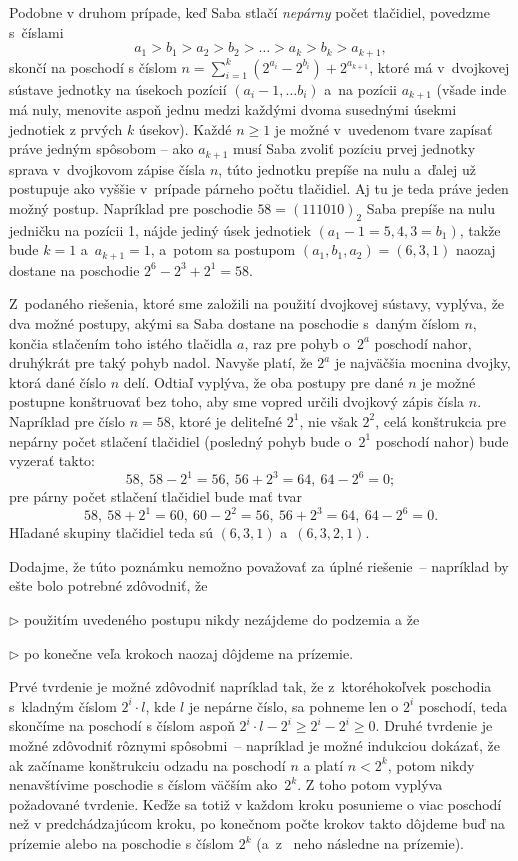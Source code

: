 {Podobne v druhom prípade, keď Saba stlačí {\it nepárny} počet tlačidiel, povedzme s~číslami
$$a_1>b_1>a_2>b_2>\dots>a_k>b_k>a_{k+1},
$$
skončí na poschodí s číslom $n=\sum_{i=1}^k (2^{a_i} - 2^{b_i}) + 2^{a_{k+1}}$, ktoré má v~dvojkovej sústave jednotky na úsekoch pozícií $(a_i-1,\dots b_i)$ a~na pozícii $a_{k+1}$ (všade inde má nuly, menovite aspoň jednu medzi každými dvoma susednými úsekmi jednotiek z prvých $k$ úsekov). Každé $n\geq1$ je možné v~uvedenom tvare zapísať práve jedným spôsobom -- ako $a_{k+1}$ musí Saba zvoliť pozíciu prvej jednotky sprava v~dvojkovom zápise čísla $n$, túto jednotku prepíše na nulu a~ďalej už postupuje ako vyššie v~prípade párneho počtu tlačidiel. Aj tu je teda práve jeden možný postup. Napríklad pre poschodie $58=(111010)_2$ Saba prepíše na nulu jedničku na pozícii 1, nájde jediný úsek jednotiek $(a_1-1=5,4,3=b_1)$, takže bude $k=1$ a~$a_{k+1}=1$, a~potom sa postupom $(a_1,b_1,a_2)=(6,3,1)$ naozaj dostane na poschodie $2^6-2^3+2^1=58$.

\poznamka
Z~podaného riešenia, ktoré sme založili na použití dvojkovej sústavy, vyplýva,
že dva možné postupy, akými sa Saba dostane na poschodie s~daným číslom $n$,
končia stlačením toho istého tlačidla $a$, raz pre pohyb o~$2^a$ poschodí nahor,
druhýkrát pre taký pohyb nadol. Navyše platí, že $2^a$ je najväčšia mocnina dvojky, ktorá
dané číslo $n$ delí. Odtiaľ vyplýva, že oba postupy pre dané $n$ je možné postupne konštruovať  bez toho, aby sme vopred určili dvojkový zápis čísla $n$. Napríklad pre číslo $n=58$, ktoré je deliteľné $2^1$, nie však $2^2$, celá konštrukcia pre nepárny počet stlačení tlačidiel (posledný pohyb bude o~$2^1$ poschodí nahor) bude vyzerať takto:
$$
58,\ 58-2^1=56,\ 56+2^3=64,\ 64-2^6=0;
$$
pre párny počet stlačení tlačidiel bude mať tvar
$$
58,\ 58+2^1=60,\ 60-2^2=56,\ 56+2^3=64,\ 64-2^6=0.
$$
Hľadané skupiny tlačidiel teda sú $(6,3,1)$ a~$(6,3,2,1)$.

Dodajme, že túto poznámku nemožno považovať za úplné riešenie~-- napríklad by ešte bolo potrebné zdôvodniť, že

\smallskip
\item{$\triangleright$} použitím uvedeného postupu  nikdy nezájdeme do podzemia a že
\item{$\triangleright$} po konečne veľa krokoch naozaj dôjdeme na prízemie.

\smallskip\noindent
Prvé tvrdenie je možné zdôvodniť napríklad tak, že z~ktoréhokoľvek poschodia s~kladným číslom $2^i \cdot l$, kde $l$ je nepárne číslo, sa pohneme len o $2^i$ poschodí, teda skončíme na poschodí s číslom aspoň $2^i \cdot l - 2^i \ge 2^i - 2^i \ge 0$.
Druhé tvrdenie je možné zdôvodniť rôznymi spôsobmi~-- napríklad je možné indukciou dokázať, že ak začíname konštrukciu odzadu na poschodí $n$ a platí $n < 2^{k}$, potom nikdy nenavštívime poschodie s číslom väčším ako~$2^k$. Z toho potom vyplýva požadované tvrdenie. Keďže sa totiž v každom kroku posunieme o viac poschodí než v predchádzajúcom kroku, po konečnom počte krokov takto dôjdeme buď na prízemie alebo na poschodie s číslom $2^{k}$ (a~z~ neho následne na prízemie).

}
